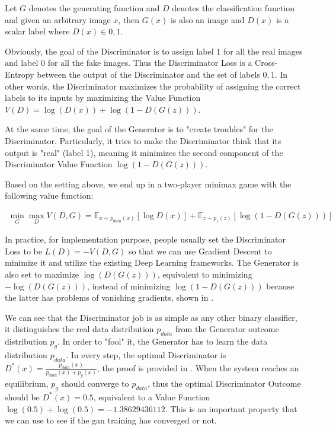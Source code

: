 Let $G$ denotes the generating function and $D$ denotes the classification function and
given an arbitrary image $x$, then $G(x)$ is also an image and $D(x)$ is a scalar label where
$D(x) \in {0, 1}$.

Obviously, the goal of the Discriminator is to assign label 1 for all the real images and
label 0 for all the fake images. Thus the Discriminator Loss is a Cross-Entropy between
the output of the Discriminator and the set of labels ${0, 1}$. In other words, the
Discriminator maximizes the probability of assigning the correct labels to its inputs by
maximizing the Value Function $V(D) = \log(D(x)) + \log(1 - D(G(z)))$.

At the same time, the goal of the Generator is to "create troubles" for the Discriminator.
Particularly, it tries to make the Discriminator think that its output is "real" (label
1), meaning it minimizes the second component of the Discriminator Value Function $\log(1
- D(G(z)))$.

Based on the setting above, we end up in a two-player minimax game with the 
following value function:

\begin{align*}
	\min_{G} \max_{D} V(D, G) = \mathbb{E}_{x \sim p_{data}(x)} [\log D(x)] +
	\mathbb{E}_{z \sim p_z(z)}[\log(1 - D(G(z)))]
\end{align*}

In practice, for implementation purpose, people usually set the Discriminator Loss to be
$L(D) = -V(D, G)$ so that we can use Gradient Descent to minimize it and utilize the
existing Deep Learning frameworks. The Generator is also set to maximize $\log(D(G(z)))$,
equivalent to minimizing $-\log(D(G(z)))$, instead of minimizing $\log(1 - D(G(z)))$
because the latter has problems of vanishing gradients, shown in \cite{gan}.

We can see that the Discriminator job is as simple as any other binary classifier, it
distinguishes the real data distribution $p_{data}$ from the Generator outcome
distribution $p_{g}$. In order to "fool" it, the Generator has to learn the data
distribution $p_{data}$. In every step, the optimal Discriminator is $D^{*}(x) =
\frac{p_{data}(x)}{p_{data}(x) + p_{g}(x)}$, the proof is provided in \cite{gan}. When the
system reaches an equilibrium, $p_{g}$ should converge to $p_{data}$, thus the optimal
Discriminator Outcome should be $D^*(x) = 0.5$, equivalent to a Value Function $\log(0.5)
+ \log(0.5) = -1.38629436112$. This is an important property that we can use to
see if the \acrshort{gan} training has converged or not.

